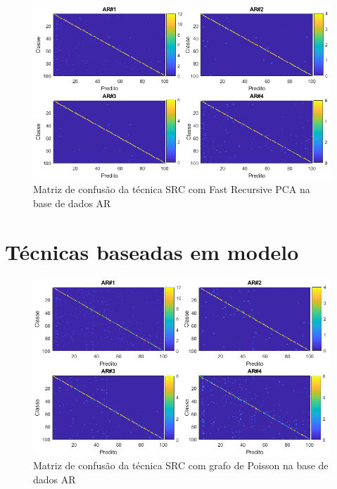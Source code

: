 \begin{figure}[H]
\caption{Matriz de confusão da técnica SRC com Fast Recursive PCA na base de dados AR}
\centering
\includegraphics[scale = 0.65]{imgs4/matrizes_confusao/src_fast_rec_PCA}
\end{figure}




\section{Técnicas baseadas em modelo}



\begin{figure}[H]
\caption{Matriz de confusão da técnica SRC com grafo de Poisson na base de dados AR}
\centering
\includegraphics[scale = 0.65]{imgs4/matrizes_confusao/SRC_GP}
\end{figure}



